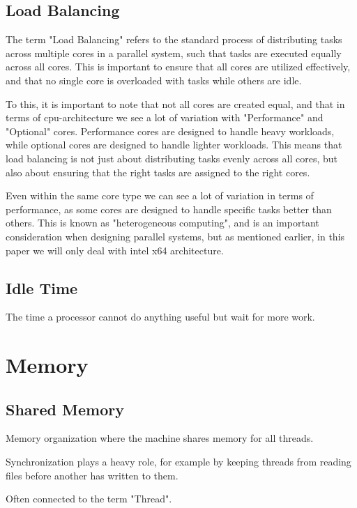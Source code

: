 \documentclass[12pt,a4paper]{article}
\begin{document}
\subsection{Load Balancing}

The term "Load Balancing" refers to the standard process of distributing tasks across multiple cores in a parallel system, such that tasks are executed equally across all cores. This is important to ensure that all cores are utilized effectively, and that no single core is overloaded with tasks while others are idle.

To this, it is important to note that not all cores are created equal, and that in terms of cpu-architecture we see a lot of variation with "Performance" and "Optional" cores. Performance cores are designed to handle heavy workloads, while optional cores are designed to handle lighter workloads. This means that load balancing is not just about distributing tasks evenly across all cores, but also about ensuring that the right tasks are assigned to the right cores. 

Even within the same core type we can see a lot of variation in terms of performance, as some cores are designed to handle specific tasks better than others. This is known as "heterogeneous computing", and is an important consideration when designing parallel systems, but as mentioned earlier, in this paper we will only deal with intel x64 architecture.

\subsection{Idle Time}

The time a processor cannot do anything useful but wait for more work.

\section{Memory}

\subsection{Shared Memory}

Memory organization where the machine shares memory for all threads.

Synchronization plays a heavy role, for example by keeping threads from reading files before another has written to them.

Often connected to the term "Thread".
\end{document}
